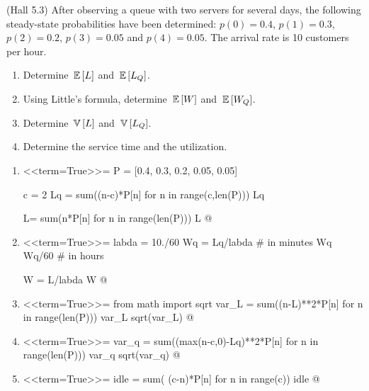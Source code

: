\begin{question}(Hall 5.3) After observing a queue with two servers
  for several days, the following steady-state probabilities have been
  determined: $p(0)=0.4$, $p(1) = 0.3$, $p(2)=0.2$, $p(3)=0.05$ and
  $p(4)=0.05$. The arrival rate is 10 customers per hour.
  \begin{enumerate}
  \item Determine $\,\mathbb{E}\left[L\right]$ and  $\,\mathbb{E}\left[L_Q\right]$. 
  \item Using Little's formula, determine $\,\mathbb{E}\left[W\right]$ and $\,\mathbb{E}\left[W_Q\right]$. 
  \item Determine $\,\mathbb{V}\left[L\right]$ and $\,\mathbb{V}\left[L_Q\right]$.
  \item Determine the service time and the utilization.
  \end{enumerate}

  \begin{solution}
    \begin{enumerate}
    \item 
<<term=True>>=
P = [0.4, 0.3, 0.2, 0.05, 0.05]

c = 2
Lq = sum((n-c)*P[n] for n in range(c,len(P)))
Lq

L= sum(n*P[n] for n in range(len(P)))
L
@

\item 
<<term=True>>=
labda = 10./60
Wq = Lq/labda # in minutes
Wq
Wq/60 # in hours

W = L/labda
W
@ 

\item 
<<term=True>>=
from math import sqrt
var_L = sum((n-L)**2*P[n] for n in range(len(P)))
var_L
sqrt(var_L)
@ 

\item 
<<term=True>>=
var_q = sum((max(n-c,0)-Lq)**2*P[n] for n in range(len(P)))
var_q
sqrt(var_q)
@

\item 
<<term=True>>=
idle = sum( (c-n)*P[n] for n in range(c))
idle
@ 
  \end{enumerate}
    \end{solution}
\end{question}  

